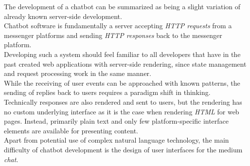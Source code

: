 The development of a chatbot can be summarized as being a slight variation of already known server-side development.
\\
Chatbot software is fundamentally a server accepting \emph{HTTP requests} from a messenger platforms and sending \emph{HTTP responses} back to the messenger platform.
\\
Developing such a system should feel familiar to all developers that have in the past created web applications with server-side rendering,
since state management and request processing work in the same manner.
\\
While the receiving of user events can be approached with known patterns, the sending of replies back to users requires a paradigm shift in thinking.
\\
Technically responses are also rendered and sent to users,
but the rendering has no custom underlying interface as it is the case when rendering \emph{HTML} for web pages.
Instead, primarily plain text and only few platform-specific interface elements are available for presenting content.
\\

Apart from potential use of complex natural language technology,
the main difficulty of chatbot development is the design of user interfaces for the medium \emph{chat}.
